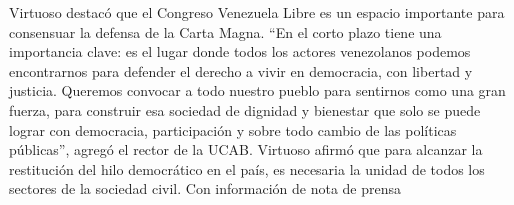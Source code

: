 \documentclass{article}%
\begin{document}
\newline%
%
Virtuoso destacó que el Congreso Venezuela Libre es un espacio importante para consensuar la defensa de la Carta Magna.%
\newline%
%
“En el corto plazo tiene una importancia clave: es el lugar donde todos los actores venezolanos podemos encontrarnos para defender el derecho a vivir en democracia, con libertad y justicia. Queremos convocar a todo nuestro pueblo para sentirnos como una gran fuerza, para construir esa sociedad de dignidad y bienestar que solo se puede lograr con democracia, participación y sobre todo cambio de las políticas públicas”, agregó el rector de la UCAB.%
\newline%
%
Virtuoso afirmó que para alcanzar la restitución del hilo democrático en el país, es necesaria la unidad de todos los sectores de la sociedad civil.%
\newline%
%
Con información de nota de prensa%
\newline%
%
\end{document}
